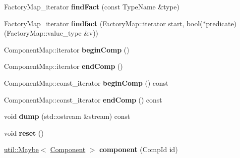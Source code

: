 \begin{DoxyCompactItemize}
\item 
\hypertarget{classtheoria_1_1core_1_1Registry_a54ee3016a6f14b3bedfecd3566caf0b5}{Factory\+Map\+\_\+iterator {\bfseries find\+Fact} (const Type\+Name \&type)}\label{classtheoria_1_1core_1_1Registry_a54ee3016a6f14b3bedfecd3566caf0b5}

\item 
\hypertarget{classtheoria_1_1core_1_1Registry_a044928d257bed09b8c288c41e5c95a26}{Factory\+Map\+\_\+iterator {\bfseries findfact} (Factory\+Map\+::iterator start, bool($\ast$predicate)(Factory\+Map\+::value\+\_\+type \&v))}\label{classtheoria_1_1core_1_1Registry_a044928d257bed09b8c288c41e5c95a26}

\item 
\hypertarget{classtheoria_1_1core_1_1Registry_a18f0cf6b2c11daeac894231aabc2d6c3}{Component\+Map\+::iterator {\bfseries begin\+Comp} ()}\label{classtheoria_1_1core_1_1Registry_a18f0cf6b2c11daeac894231aabc2d6c3}

\item 
\hypertarget{classtheoria_1_1core_1_1Registry_a66ed200d29e49b9eb762a29f580c102a}{Component\+Map\+::iterator {\bfseries end\+Comp} ()}\label{classtheoria_1_1core_1_1Registry_a66ed200d29e49b9eb762a29f580c102a}

\item 
\hypertarget{classtheoria_1_1core_1_1Registry_aa493493b6fef9a16a73e554aa5db5ea6}{Component\+Map\+::const\+\_\+iterator {\bfseries begin\+Comp} () const }\label{classtheoria_1_1core_1_1Registry_aa493493b6fef9a16a73e554aa5db5ea6}

\item 
\hypertarget{classtheoria_1_1core_1_1Registry_a4767d6f21b33aef3f68566e6f0587991}{Component\+Map\+::const\+\_\+iterator {\bfseries end\+Comp} () const }\label{classtheoria_1_1core_1_1Registry_a4767d6f21b33aef3f68566e6f0587991}

\item 
\hypertarget{classtheoria_1_1core_1_1Registry_a89d93cea065fb51be29d8f56654cede1}{void {\bfseries dump} (std\+::ostream \&stream) const }\label{classtheoria_1_1core_1_1Registry_a89d93cea065fb51be29d8f56654cede1}

\item 
\hypertarget{classtheoria_1_1core_1_1Registry_af66ab76f6173d7e7c99a0c47dc2bfd70}{void {\bfseries reset} ()}\label{classtheoria_1_1core_1_1Registry_af66ab76f6173d7e7c99a0c47dc2bfd70}

\item 
\hypertarget{classtheoria_1_1core_1_1Registry_a33f5edc42d5a194a7682bf0bf20cbf52}{\hyperlink{classtheoria_1_1util_1_1Maybe}{util\+::\+Maybe}$<$ \hyperlink{classtheoria_1_1core_1_1Component}{Component} $>$ {\bfseries component} (Comp\+Id id)}\label{classtheoria_1_1core_1_1Registry_a33f5edc42d5a194a7682bf0bf20cbf52}


\end{DoxyCompactItemize}
